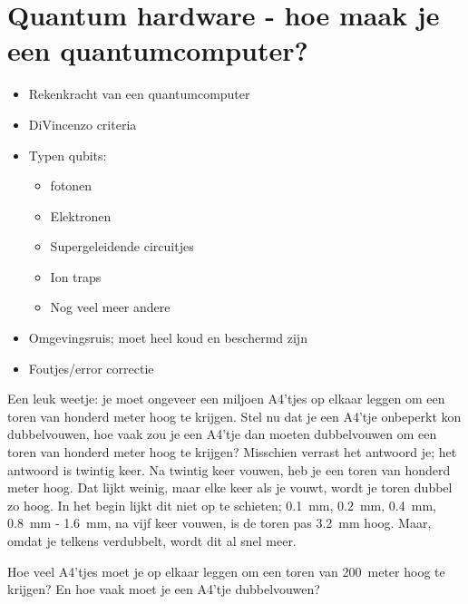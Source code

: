 \documentclass[../../main.tex]{subfiles}
\begin{document}
\onlyinsubfile{
\setcounter{chapter}{4}
}
\notinsubfile{}

\chapter{Quantum hardware - hoe maak je een quantumcomputer?}\label{chap:H5}

\iffalse
Ongeveer 10 pagina's? inclusief alle opgaven, antwoorden en plaatjes
\fi
\begin{itemize}
\item Rekenkracht van een quantumcomputer
\item DiVincenzo criteria
\item Typen qubits:
\begin{itemize}
\item fotonen
\item Elektronen
\item Supergeleidende circuitjes
\item Ion traps
\item Nog veel meer andere
\end{itemize}
\item Omgevingsruis; moet heel koud en beschermd zijn
\item Foutjes/error correctie
\end{itemize}

Een leuk weetje: je moet ongeveer een miljoen A4'tjes op elkaar leggen om een toren van honderd meter hoog te krijgen. Stel nu dat je een A4'tje onbeperkt kon dubbelvouwen, hoe vaak zou je een A4'tje dan moeten dubbelvouwen om een toren van honderd meter hoog te krijgen? Misschien verrast het antwoord je; het antwoord is twintig keer. Na twintig keer vouwen, heb je een toren van honderd meter hoog. Dat lijkt weinig, maar elke keer als je vouwt, wordt je toren dubbel zo hoog. In het begin lijkt dit niet op te schieten; \SI{0.1}{\milli\meter}, \SI{0.2}{\milli\meter}, \SI{0.4}{\milli\meter}, \SI{0.8}{\milli\meter} - \SI{1.6}{\milli\meter}, na vijf keer vouwen, is de toren pas \SI{3.2}{\milli\meter} hoog. Maar, omdat je telkens verdubbelt, wordt dit al snel meer.

\begin{antwoord}
\end{antwoord}
\begin{opdracht}
Hoe veel A4'tjes moet je op elkaar leggen om een toren van 200~meter hoog te krijgen? En hoe vaak moet je een A4'tje dubbelvouwen? 
\end{opdracht}
\end{document}
